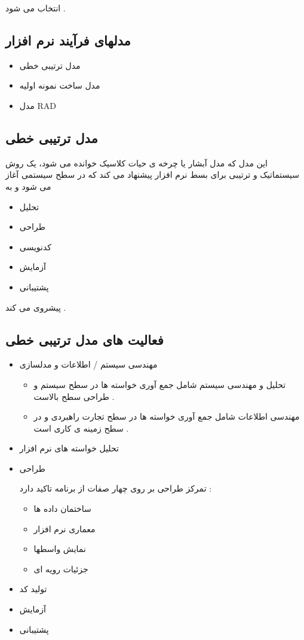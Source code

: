 \documentclass{article}
\begin{document}
انتخاب می شود .

\subsection{مدلهای فرآیند نرم افزار}

\begin{itemize}
	\item مدل ترتیبی خطی
	\item مدل ساخت نمونه اولیه
	\item مدل RAD
\end{itemize}



\subsection{  مدل ترتیبی خطی}

این مدل که مدل آبشار یا چرخه ی حیات کلاسیک خوانده می شود، یک روش سیستماتیک و ترتیبی برای بسط نرم افزار پیشنهاد می کند که در سطح سیستمی آغاز می شود و به 

\begin{itemize}
	\item تحلیل
	\item طراحی
	\item کدنویسی
	\item آزمایش
	\item پشتیبانی
\end{itemize}

پیشروی می کند .


\newpage

\subsection{فعالیت های مدل ترتیبی خطی}

\begin{itemize}
	\item مهندسی سیستم / اطلاعات و مدلسازی
		\begin{itemize}
			\item تحلیل و مهندسی سیستم شامل جمع آوری خواسته ها در سطح سیستم و طراحی سطح بالاست .
			\item مهندسی اطلاعات شامل جمع آوری خواسته ها در سطح تجارت راهبردی و در سطح زمینه ی کاری است .
		\end{itemize}
	\item تحلیل خواسته های نرم افزار
	\item طراحی
	
		تمرکز طراحی بر روی چهار صفات از برنامه تاکید دارد :
		\begin{itemize}
		\item ساختمان داده ها
		\item معماری نرم افزار
		\item نمایش واسطها
		\item جزئیات رویه ای
		\end{itemize}
	\item تولید کد
	\item آزمایش
	\item پشتیبانی
\end{itemize}
\end{document}
